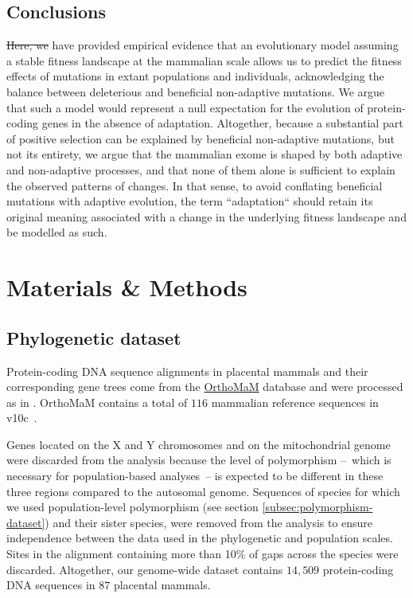 \documentclass{article}
\providecommand{\DIFaddtex}[1]{{\protect\color{blue}\uwave{#1}}} %
\providecommand{\DIFdeltex}[1]{{\protect\color{red}\sout{#1}}}                      %
\providecommand{\DIFaddbegin}{} %
\providecommand{\DIFaddend}{} %
\providecommand{\DIFdelbegin}{} %
\providecommand{\DIFdelend}{} %
\providecommand{\DIFadd}[1]{\texorpdfstring{\DIFaddtex{#1}}{#1}} %
\providecommand{\DIFdel}[1]{\texorpdfstring{\DIFdeltex{#1}}{}} %
\newcommand{\DIFscaledelfig}{0.5}
\newlength{\DIFdelgraphicswidth} %
\newlength{\DIFdelgraphicsheight} %
\newcommand{\DIFaddincludegraphics}[2][]{{\color{blue}\fbox{\DIFOincludegraphics[#1]{#2}}}} %
\newcommand{\DIFdelincludegraphics}[2][]{%
\sbox{\DIFdelgraphicsbox}{\DIFOincludegraphics[#1]{#2}}%
\settoboxwidth{\DIFdelgraphicswidth}{\DIFdelgraphicsbox} %
\settoboxtotalheight{\DIFdelgraphicsheight}{\DIFdelgraphicsbox} %
\scalebox{\DIFscaledelfig}{%
\parbox[b]{\DIFdelgraphicswidth}{\usebox{\DIFdelgraphicsbox}\\[-\baselineskip] \rule{\DIFdelgraphicswidth}{0em}}\llap{\resizebox{\DIFdelgraphicswidth}{\DIFdelgraphicsheight}{%
\setlength{\unitlength}{\DIFdelgraphicswidth}%
\begin{picture}(1,1)%
\thicklines\linethickness{2pt} %
{\color[rgb]{1,0,0}\put(0,0){\framebox(1,1){}}}%
{\color[rgb]{1,0,0}\put(0,0){\line( 1,1){1}}}%
{\color[rgb]{1,0,0}\put(0,1){\line(1,-1){1}}}%
\end{picture}%
}\hspace*{3pt}}} %
} %
\DeclareRobustCommand{\DIFaddbegin}{\DIFOaddbegin \let\includegraphics\DIFaddincludegraphics} %
\DeclareRobustCommand{\DIFaddend}{\DIFOaddend \let\includegraphics\DIFOincludegraphics} %
\DeclareRobustCommand{\DIFdelbegin}{\DIFOdelbegin \let\includegraphics\DIFdelincludegraphics} %
\DeclareRobustCommand{\DIFdelend}{\DIFOaddend \let\includegraphics\DIFOincludegraphics} %
\begin{document}
    \subsection*{Conclusions}

    \DIFdelbegin \DIFdel{Here, we }\DIFdelend \DIFaddbegin \DIFadd{We }\DIFaddend have provided empirical evidence that an evolutionary model assuming a stable fitness landscape at the mammalian scale allows us to predict the fitness effects of mutations in extant populations and individuals, acknowledging the balance between deleterious and beneficial non-adaptive mutations.
    We argue that such a model would represent a null expectation for the evolution of protein-coding genes in the absence of adaptation.
    Altogether, because a substantial part of positive selection can be explained by beneficial non-adaptive mutations, but not its entirety, we argue that the mammalian exome is shaped by both adaptive and non-adaptive processes, and that none of them alone is sufficient to explain the observed patterns of changes.
    In that sense, to avoid conflating beneficial mutations with adaptive evolution, the term ``adaptation`` should retain its original meaning associated with a change in the underlying fitness landscape and be modelled as such\DIFaddbegin \DIFadd{~\mbox{%
\cite{mustonen_fitness_2009, mustonen_fitness_2010}}\hskip0pt%
}\DIFaddend .

    \DIFaddbegin \newpage
    \DIFaddend \section{Materials \& Methods}
    \label{sec:methods}

    \subsection{Phylogenetic dataset}\label{subsec:phylo-dataset}

    Protein-coding DNA sequence alignments in placental mammals and their corresponding gene trees come from the \href{https://www.orthomam.univ-montp2.fr}{OrthoMaM} database and were processed as in \textcite{latrille_genes_2023}.
    OrthoMaM contains a total of $116$ mammalian reference sequences in v10c~\cite{ranwez_orthomam_2007, douzery_orthomam_2014, scornavacca_orthomam_2019}.

    Genes located on the X and Y chromosomes and on the mitochondrial genome were discarded from the analysis because the level of polymorphism –~which is necessary for population-based analyses~– is expected to be different in these three regions compared to the autosomal genome.
    Sequences of species for which we used population-level polymorphism (see section \ref{subsec:polymorphism-dataset}) and their sister species, were removed from the analysis to ensure independence between the data used in the phylogenetic and population scales.
    Sites in the alignment containing more than 10\% of gaps across the species were discarded.
    Altogether, our genome-wide dataset contains $14,509$ protein-coding DNA sequences in $87$ placental mammals.
\end{document}
